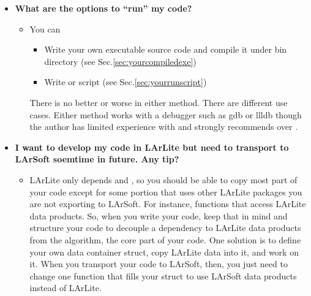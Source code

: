 \begin{itemize}
\item[] {\bf What are the options to ``run'' my code? }
  \begin{itemize}
    \item You can 
      \begin{itemize}
        \item Write your own executable source code and compile it under {\ttfamily bin} directory (see Sec.\ref{sec:yourcompiledexe})
        \item Write \CINT or \PyROOT script (see Sec.\ref{sec:yourrunscript})
      \end{itemize}
      There is no better or worse in either method. There are different use cases. Either method works with a debugger such as {\ttfamily gdb} or {\ttfamily llldb} though the author has limited experience with \CINT and strongly recommends \PyROOT over \CINT.
  \end{itemize}

\item[] {\bf I want to develop my code in LArLite but need to transport to LArSoft soemtime in future. Any tip?}
  \begin{itemize}
    \item LArLite only depends \ROOT and \CPP, so you should be able to copy most part of your code except for some portion that uses other LArLite packages you are not exporting to LArSoft. For instance, functions that access LArLite data products. So, when you write your code, keep that in mind and structure your code to decouple a dependency to LArLite data products from the algorithm, the core part of your code. One solution is to define your own data container \CPP struct, copy LArLite data into it, and work on it. When you transport your code to LArSoft, then, you just need to change one function that fills your \CPP struct to use LArSoft data products instead of LArLite.
  \end{itemize}

\end{itemize}
